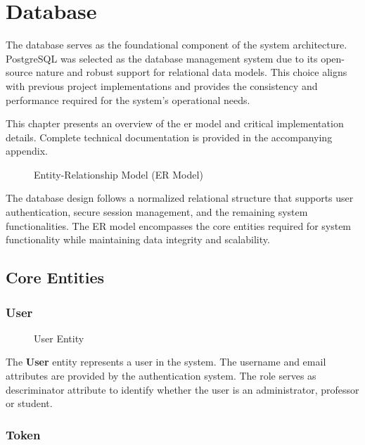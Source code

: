\chapter{Database} \label{cap:database}
The database serves as the foundational component of the system architecture. PostgreSQL was selected as the database management system due to its open-source nature and robust support for relational data models. This choice aligns with previous project implementations and provides the consistency and performance required for the system's operational needs.

This chapter presents an overview of the \ac{er model} and critical implementation details. Complete technical documentation is provided in the accompanying appendix.

\begin{figure}[H]
    \centering
    
    \caption{Entity-Relationship Model (ER Model)}
    \label{fig:er_model}
\end{figure}

The database design follows a normalized relational structure that supports user authentication, secure session management, and the remaining system functionalities. The ER model encompasses the core entities required for system functionality while maintaining data integrity and scalability.

\section{Core Entities}
\subsection*{User}

\begin{figure}[H]
    \centering
    
    \caption{User Entity}
    \label{fig:user_entity}
\end{figure}

The \textbf{User} entity represents a user in the system. The username and email attributes are provided by the authentication system. The role serves as descriminator attribute to identify whether the user is an administrator, professor or student.

\subsection*{Token}

